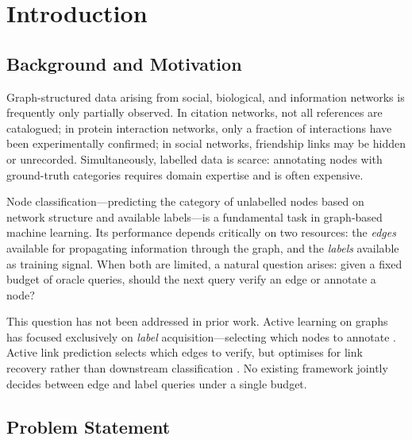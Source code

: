 \documentclass[12pt,a4paper,oneside]{report}
\begin{document}
\newpage
\tableofcontents
\newpage
\listoftables
\listoffigures

\chapter{Introduction}
\label{ch:intro}

\section{Background and Motivation}

Graph-structured data arising from social, biological, and information networks is frequently only partially observed. In citation networks, not all references are catalogued; in protein interaction networks, only a fraction of interactions have been experimentally confirmed; in social networks, friendship links may be hidden or unrecorded. Simultaneously, labelled data is scarce: annotating nodes with ground-truth categories requires domain expertise and is often expensive.

Node classification---predicting the category of unlabelled nodes based on network structure and available labels---is a fundamental task in graph-based machine learning. Its performance depends critically on two resources: the \emph{edges} available for propagating information through the graph, and the \emph{labels} available as training signal. When both are limited, a natural question arises: given a fixed budget of oracle queries, should the next query verify an edge or annotate a node?

This question has not been addressed in prior work. Active learning on graphs has focused exclusively on \emph{label} acquisition---selecting which nodes to annotate \citep{gpa, settles}. Active link prediction selects which edges to verify, but optimises for link recovery rather than downstream classification \citep{alpine}. No existing framework jointly decides between edge and label queries under a single budget.

\section{Problem Statement}
\end{document}
